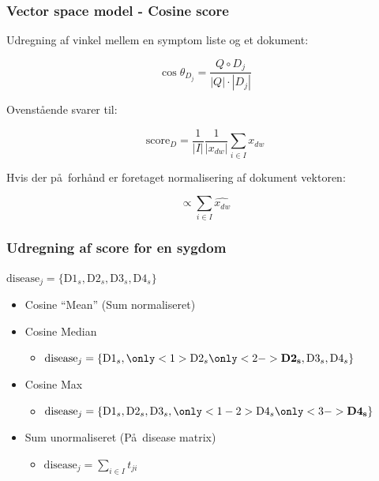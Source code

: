 \documentclass[xcolor=table]{beamer}
\begin{document}
\begin{frame}

  \frametitle{Vector space model - Cosine score}

  Udregning af vinkel mellem en symptom liste og et dokument:
  
  \[
  \cos \theta_{D_j} = \frac{Q \circ D_j}{|Q| \cdot |D_j|}
  \]
  
  Ovenst\aa ende svarer til:
  
  \[
  \textrm{score}_{D} = \frac{1}{|I|}\frac{1}{|x_{dw}|} \sum_{i \in I} x_{dw}
  \]
  
  Hvis der p\aa\ forh\aa nd er foretaget normalisering af dokument vektoren:
  
  \[
  \propto  \sum_{i \in I} \widehat{x_{dw}}
  \]
  
\end{frame}

\begin{frame}

  \frametitle{Udregning af score for en sygdom}
  
  $\textrm{disease}_j = \{\textrm{D1}_{s}, \textrm{D2}_{s},
  \textrm{D3}_{s}, \textrm{D4}_{s} \}$

  \begin{itemize}
    \item Cosine ``Mean'' (Sum normaliseret)
      \begin{itemize}
      \end{itemize}
    \item Cosine Median
      \begin{itemize}
        \item $ \textrm{disease}_j =
        \{\textrm{D1}_{s}, \only<1>{\textrm{D2}_{s}}
        \only<2->{\textbf{D2}_{\mathbf{s}}}, \textrm{D3}_{s},
        \textrm{D4}_{s} \}$
      \end{itemize}
    \item Cosine Max
      \begin{itemize}
        \item $ \textrm{disease}_j =
        \{\textrm{D1}_{s}, \textrm{D2}_{s},
        \textrm{D3}_{s}, \only<1-2>{\textrm{D4}_{s}}
        \only<3->{\textbf{D4}_{\mathbf{s}}} \}$
      \end{itemize}
    \item Sum unormaliseret (P\aa\ disease matrix)
      \begin{itemize}
        \item $\textrm{disease}_j = \sum_{i \in I} t_{ji}$
      \end{itemize}
  \end{itemize}

\end{frame}
\end{document}
